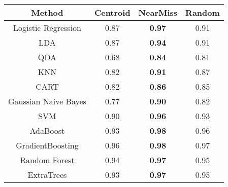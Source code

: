 \begin{minipage}{\textwidth}
  \hspace{-3.25cm}
  \begin{minipage}[H]{0.63\textwidth}
    \centering
    
    \label{fig:visa_roc_random}
  \end{minipage}
  \hspace{0.25cm}
  \begin{minipage}[H]{0.5\textwidth}
    \centering
    \begin{tabular}{|c|c|c|c|}
        \hline
        \textbf{Method} & \textbf{Centroid} & \textbf{NearMiss} & \textbf{Random} \\
        \hline
        Logistic Regression  & 0.87 & \textbf{0.97} & 0.91 \\
        LDA                  & 0.87 & \textbf{0.94} & 0.91 \\
        QDA                  & 0.68 & \textbf{0.84} & 0.81\\
        KNN                  & 0.82 & \textbf{0.91} & 0.87 \\
        CART                 & 0.82 & \textbf{0.86} & 0.85 \\
        Gaussian Naive Bayes & 0.77 & \textbf{0.90} & 0.82 \\
        SVM                  & 0.90 & \textbf{0.96} & 0.93 \\
        AdaBoost             & 0.93 & \textbf{0.98} & 0.96 \\
        GradientBoosting     & 0.96 & \textbf{0.98} & 0.97 \\
        Random Forest        & 0.94 & \textbf{0.97} & 0.95 \\
        ExtraTrees           & 0.93 & \textbf{0.97} & 0.95 \\
        \hline
    \end{tabular}
    \label{tab:visa_auc}
  \end{minipage}
\end{minipage}


